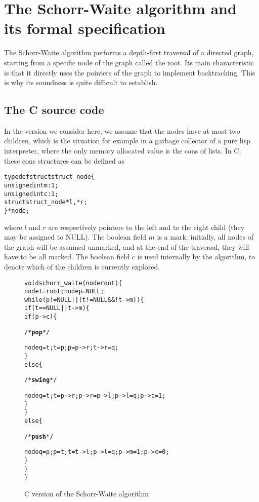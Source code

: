 
\section{The Schorr-Waite algorithm and its formal specification}
\label{sec:algo}

The Schorr-Waite algorithm performs a depth-first traversal of a
directed graph, starting from a specific node of the graph called the
root. Its main characteristic is that it directly uses the pointers of
the graph to implement backtracking. This is why its soundness is
quite difficult to establish. 

\subsection{The C source code}

In the version we consider here, we assume that the nodes have
at most two children, which is the situation for example in a garbage
collector of a pure lisp interpreter, where the only memory allocated
value is the \textsf{cons} of lists. In C, these \textsf{cons}
structures can be defined as
\begin{alltt}
typedef struct struct_node \{
  unsigned int m :1;
  unsigned int c :1;
  struct struct_node *l, *r;
\} * node;
\end{alltt}
where $l$ and $r$ are respectively pointers to the left and to the
right child (they may be assigned to NULL). The boolean field $m$ is a
mark: initially, all nodes of the graph will be assumed unmarked, and
at the end of the traversal, they will have to be all marked. The
boolean field $c$ is used internally by the algorithm, to denote which
of the children is currently explored.
 
\begin{figure}[b]
\begin{alltt}
void schorr_waite(node root) \{
  node t = root; node p = NULL;
  while (p != NULL || (t != NULL && ! t->m)) \{
    if (t == NULL || t->m) \{
      if (p->c) \{ \begin{slshape}/* \textbf{pop} */\end{slshape}
        node q = t; t = p; p = p->r; t->r = q;
      \} 
      else \{ \begin{slshape}/* \textbf{swing} */\end{slshape}
        node q = t; t = p->r; p->r = p->l; p->l = q; p->c = 1;
      \}
    \} 
    else \{ \begin{slshape}/* \textbf{push} */ \end{slshape}
      node q = p; p = t; t = t->l; p->l = q; p->m = 1; p->c = 0;
    \}
  \}
\}
\end{alltt}
\caption{C version of the Schorr-Waite algorithm}
\label{fig:code}
\end{figure}


